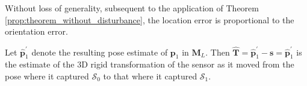 \begin{remark}
  \label{remark:loc_prop_or}
  Without loss of generality, subsequent to the application of Theorem
  \ref{prop:theorem_without_disturbance}, the location error is proportional to
  the orientation error.
\end{remark}

Let $\hat{\bm{p}}_1^\prime$ denote the resulting pose estimate of $\bm{p}_1$
in $\bm{M}_L$. Then
$\hat{\bm{T}} = \hat{\bm{p}}_1^\prime - \bm{s} = \hat{\bm{p}}_1^\prime$ is the
estimate of the 3D rigid transformation of the sensor as it moved from the pose
where it captured $\mathcal{S}_0$ to that where it captured $\mathcal{S}_1$.
